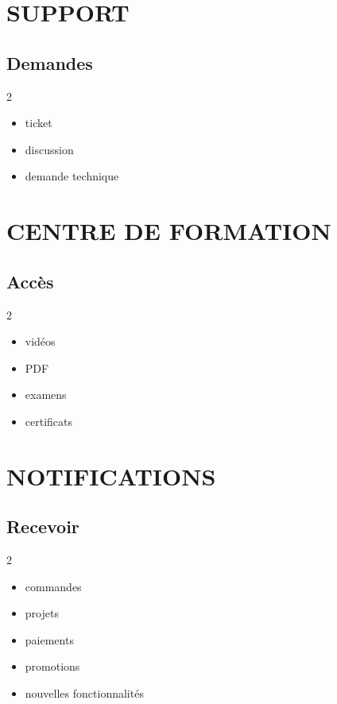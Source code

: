 \documentclass[12pt,a4paper,oneside]{book}
\begin{document}
\chapter{SUPPORT}

\section{Demandes}
\begin{multicols}{2}
\begin{itemize}
\item ticket
\item discussion
\item demande technique
\end{itemize}
\end{multicols}

\chapter{CENTRE DE FORMATION}

\section{Accès}
\begin{multicols}{2}
\begin{itemize}
\item vidéos
\item PDF
\item examens
\item certificats
\end{itemize}
\end{multicols}

\chapter{NOTIFICATIONS}

\section{Recevoir}
\begin{multicols}{2}
\begin{itemize}
\item commandes
\item projets
\item paiements
\item promotions
\item nouvelles fonctionnalités
\end{itemize}
\end{multicols}
\end{document}

